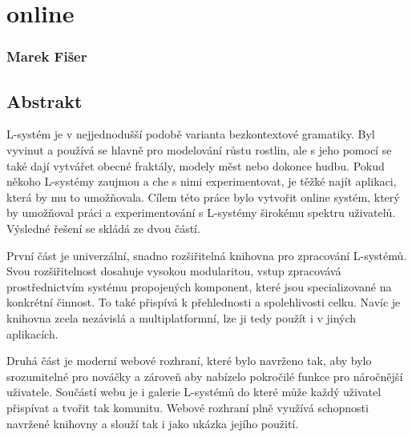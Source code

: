 
\chapter*{\lsystems online}

\subsection*{Marek Fišer}

\section*{Abstrakt}

\mbox{L-systém} je v nejjednodušší podobě varianta bezkontextové gramatiky.
Byl vyvi\-nut a používá se hlavně pro modelování růstu rostlin, ale s jeho pomocí se také dají vytvářet obecné fraktály, modely měst nebo dokonce hudbu.
Pokud někoho \mbox{L-systémy} zaujmou a che s nimi experimentovat, je těžké najít aplikaci, která by mu to umožňovala.
Cílem této práce bylo vytvořit online systém, který by umožňoval práci a experimentování s L-systémy širokému spektru uživatelů.
Výsledné řešení se skládá ze dvou částí.

První část je univerzální, snadno rozšiřitelná knihovna pro zpracování \mbox{L-sys}\-témů.
Svou rozšiřitelnost dosahuje vysokou modularitou, vstup zpracovává pros\-třednic\-tvím systému propojených komponent, které jsou specializované na kon\-krét\-ní činnost.
To také přispívá k přehlednosti a spolehlivosti celku.
Navíc je knihovna zcela nezávislá a multiplatformní, lze ji tedy použít i v jiných aplikacích.

Druhá část je moderní webové rozhraní, které bylo navrženo tak, aby bylo srozumitelné pro nováčky a zároveň aby nabízelo pokročilé funkce pro nároč\-nější uživatele.
Součástí webu je i galerie L-systémů do které může každý uživatel přispívat a tvořit tak komunitu.
Webové rozhraní plně využívá schopnosti navr\-žené knihovny a slouží tak i jako ukázka jejího použití.





























